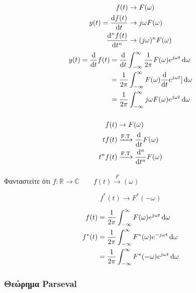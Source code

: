      \paragraph{}
     \begin{align*}
     f(t) &\to F(\omega)\\
     y(t)=\od{f(t)}{t}&\to j\omega F(\omega ) \\
     \od[n]{f(t)}{t}&\to (j\omega )^nF(\omega )
     \end{align*}
     \begin{align*}
     y(t)=\od{}{t}f(t) &= \od{}{t} \int_{-\infty}^{\infty} \frac{1}{2\pi}
     F(\omega ) e^{j\omega t}\dif \omega
     \\ &= \frac{1}{2\pi}\int_{-\infty}^{\infty} F(\omega )\od{}{t}
     e^{j\omega t}]\dif \omega
     \\ &= \frac{1}{2\pi} \int_{-\infty}^{\infty} j\omega F(\omega )
     e^{j\omega t}\dif \omega
     \end{align*}
     \subparagraph{}

     \begin{align*}
     f(t)&\to F(\omega )\\
     tf(t)&\xrightarrow{\text{F.T}}\od{}{t} F(\omega )\\
     t^nf(t)&\xrightarrow{\text{F.T}}\od[n]{}{t} F(\omega )\\
     \end{align*}

     \paragraph{}
     Φανταστείτε ότι \( f:\mathbb R\to\mathbb C \qquad
     f(t) \xrightarrow F(\omega )
      \)

     \[
     f^*(t) \to F^*(-\omega )
     \]

     \begin{align*}
     f(t) &= \frac{1}{2\pi}\int_{-\infty}^{\infty} F(\omega)e^{j\omega t}\mathop{}\!\mathrm{d} \omega \\
     f^*(t) &= \frac{1}{2\pi}\int_{-\infty}^{\infty}
     F^*(\omega)e^{-j\omega t}\mathop{}\!\mathrm{d} \omega \\
     &= \frac{1}{2\pi}\int_{-\infty}^{\infty}
     F^*(-\omega )e^{j\omega t}\mathop{}\!\mathrm{d} \omega
     \end{align*}

     \subsubsection{Θεώρημα Parseval}


